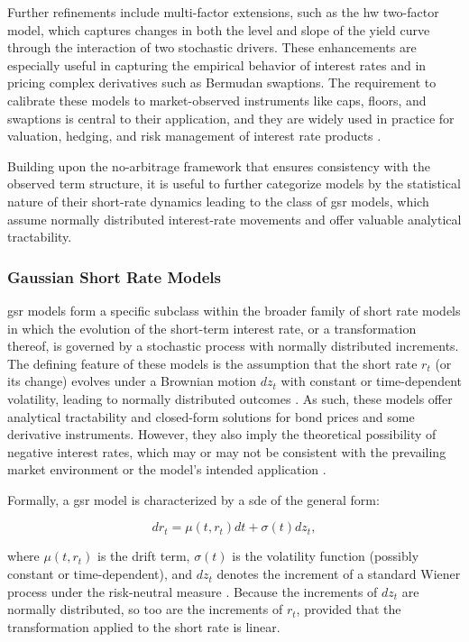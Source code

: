 Further refinements include multi-factor extensions, such as the \ac{hw} two-factor model, which captures changes in both the level and slope of the yield curve through the interaction of two stochastic drivers. These enhancements are especially useful in capturing the empirical behavior of interest rates and in pricing complex derivatives such as Bermudan swaptions. The requirement to calibrate these models to market-observed instruments like caps, floors, and swaptions is central to their application, and they are widely used in practice for valuation, hedging, and risk management of interest rate products \parencite[p.~719]{hull2015optionsfutures}.

Building upon the no-arbitrage framework that ensures consistency with the observed term structure, it is useful to further categorize models by the statistical nature of their short-rate dynamics leading to the class of \ac{gsr} models, which assume normally distributed interest-rate movements and offer valuable analytical tractability.

\subsubsection{Gaussian Short Rate Models} \label{gaussian_short_rate_models}
\ac{gsr} models form a specific subclass within the broader family of short rate models in which the evolution of the short-term interest rate, or a transformation thereof, is governed by a stochastic process with normally distributed increments. The defining feature of these models is the assumption that the short rate $r_t$ (or its change) evolves under a Brownian motion $dz_t$ with constant or time-dependent volatility, leading to normally distributed outcomes \parencite[p.~53]{brigo2006interest}. As such, these models offer analytical tractability and closed-form solutions for bond prices and some derivative instruments. However, they also imply the theoretical possibility of negative interest rates, which may or may not be consistent with the prevailing market environment or the model's intended application \parencite[pp.~719--720]{hull2015optionsfutures}.

Formally, a \ac{gsr} model is characterized by a \ac{sde}  of the general form:

\begin{equation}
	dr_t = \mu(t, r_t) dt + \sigma(t) dz_t,
\end{equation}

where $\mu(t, r_t)$ is the drift term, $\sigma(t)$ is the volatility function (possibly constant or time-dependent), and $dz_t$ denotes the increment of a standard Wiener process under the risk-neutral measure \parencite[p.~53]{brigo2006interest}. Because the increments of $dz_t$ are normally distributed, so too are the increments of $r_t$, provided that the transformation applied to the short rate is linear.

